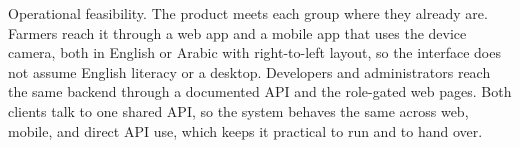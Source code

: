 Operational feasibility. The product meets each group where they already are.
Farmers reach it through a web app and a mobile app that uses the device camera,
both in English or Arabic with right-to-left layout, so the interface does not
assume English literacy or a desktop. Developers and administrators reach the same
backend through a documented API and the role-gated web pages. Both clients talk
to one shared API, so the system behaves the same across web, mobile, and direct
API use, which keeps it practical to run and to hand over.
